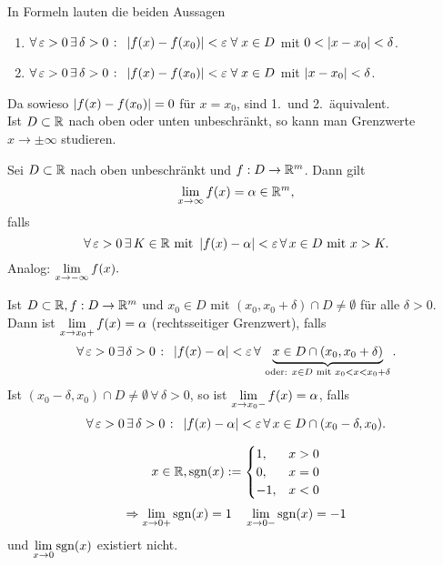\documentclass[../ana1.tex]{subfiles}
\begin{document}
\begin{bew}
    In Formeln lauten die beiden Aussagen 
    \begin{enumerate}
        \item \( \forall \, \varepsilon > 0 \,\exists \, \delta > 0
        \; \colon \; \left| f(x) - f(x_0) \right| < \varepsilon \;\forall \;
        x \in D \) mit \( 0 < \left|x-x_0\right| < \delta \).
        \item \( \forall \, \varepsilon > 0 \,\exists \, \delta > 0
        \; \colon \; \left| f(x) - f(x_0) \right| < \varepsilon \;\forall \;
        x \in D \) mit \( \left|x-x_0\right| < \delta \).
    \end{enumerate}
    Da sowieso \( \left|f(x) -f(x_0)\right| = 0 \) für \( x=x_0 \), sind 1.\ und
    2.\ äquivalent.\\
    Ist \( D\subset \mathbb{R} \) nach oben oder unten unbeschränkt, so 
    kann man Grenzwerte \( x \rightarrow \pm \infty \) studieren.
\end{bew}
\begin{defi}
    Sei \( D \subset \mathbb{R} \) nach oben unbeschränkt und 
    \( f:D\rightarrow \mathbb{R}^m \). Dann gilt 
    \[ \lim\limits_{x\rightarrow\infty} f(x) = \alpha \in \mathbb{R}^m, \]
    falls
    \[ \forall \,\varepsilon > 0 \,\exists \, K\in\mathbb{R} \text{ mit } 
    \left|f(x) - \alpha\right| < \varepsilon \,\forall \, x \in D 
    \text{ mit } x > K. \]
    Analog: \( \lim\limits_{x\rightarrow -\infty} f(x). \)
\end{defi}
\begin{defi}
    Ist \( D \subset \mathbb{R}, f : D\rightarrow \mathbb{R}^m \) und \( x_0 \in D \)
    mit \( (x_0, x_0 + \delta) \cap D \neq \emptyset \) für alle 
    \( \delta > 0 \). Dann ist \( \lim\limits_{x\rightarrow x_0+} f(x) = \alpha \) 
    (rechtsseitiger Grenzwert), falls
    \[ \forall \,\varepsilon > 0 \,\exists \, \delta > 0 \;\colon \;
    \left| f(x) - \alpha \right| < \varepsilon \,\forall \, \underbrace{ x\in D \cap 
    (x_0, x_0 + \delta) }_{ \text{oder: } x\in D \text{ mit } 
    x_0 < x < x_0 + \delta }. \]
    Ist \( (x_0 - \delta, x_0) \cap D \neq \emptyset \,\forall \, 
    \delta > 0 \), so ist \( \lim\limits_{x\rightarrow x_0-} f(x) = \alpha \), falls
    \[ \forall \, \varepsilon > 0 \,\exists \, \delta > 0 \;\colon \; 
    \left|f(x) - \alpha\right| < \varepsilon \,\forall \, x \in D \cap 
    (x_0 - \delta, x_0). \]
\end{defi}
\begin{bsp}
    \[ x\in\mathbb{R}, \mathrm{sgn}(x) := 
    \begin{cases}
        1,  &x>0\\
        0,  &x=0\\
        -1, &x<0
    \end{cases} \]
    \[ \Rightarrow \lim\limits_{x\rightarrow 0+} \mathrm{sgn}(x) = 1 \quad \lim\limits_{x\rightarrow 0-} \mathrm{sgn}(x) = -1 \]
    und \( \lim\limits_{x\rightarrow 0} \mathrm{sgn}(x) \) existiert nicht.
\end{bsp}
\end{document}
